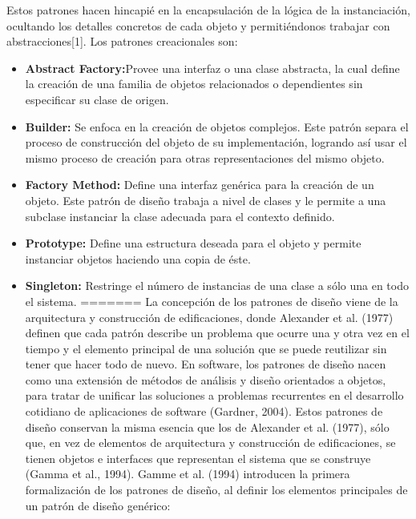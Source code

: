 \documentclass[twoside,twocolumn]{article}
\begin{document}
Estos patrones hacen hincapié en la encapsulación de la lógica de la instanciación, ocultando los detalles concretos de cada objeto y permitiéndonos trabajar con abstracciones[1]. Los patrones creacionales son: 
    \begin{itemize}
		\item \textbf{Abstract Factory:}Provee una interfaz o una clase abstracta, la cual define la creación de una familia de objetos relacionados o dependientes sin especificar su clase de origen. 
		\item \textbf{Builder:} Se enfoca en la creación de objetos complejos. Este patrón separa el proceso de construcción del objeto de su implementación, logrando así usar el mismo proceso de creación para otras representaciones del mismo objeto.  
		\item \textbf{Factory Method:} Define una interfaz genérica para la creación de un objeto. Este patrón de diseño trabaja a nivel de clases y le permite a una subclase instanciar la clase adecuada para el contexto definido.  
		\item \textbf{Prototype:}	Define una estructura deseada para el objeto y permite instanciar objetos haciendo una copia de éste.  
		\item \textbf{Singleton:} Restringe el número de instancias de una clase a sólo una en todo el sistema. 
=======
La concepción de los patrones de diseño viene de la arquitectura y construcción de edificaciones, donde Alexander et al. (1977) definen que cada patrón describe un problema que ocurre una y otra vez en el tiempo y el elemento principal de una solución que se puede reutilizar sin tener que hacer todo de nuevo.  
En software, los patrones de diseño nacen como una extensión de métodos de análisis y diseño orientados a objetos, para tratar de unificar las soluciones a problemas recurrentes en el desarrollo cotidiano de aplicaciones de software (Gardner, 2004). Estos patrones de diseño conservan la misma esencia que los de Alexander et al. (1977), sólo que, en vez de elementos de arquitectura y construcción de edificaciones, se tienen objetos e interfaces que representan el sistema que se construye (Gamma et al., 1994).  
Gamme et al. (1994) introducen la primera formalización de los patrones de diseño, al definir los elementos principales de un patrón de diseño genérico: 


\end{itemize}
\end{document}
